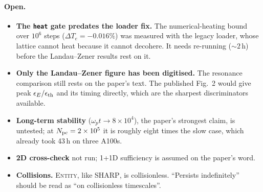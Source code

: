 \documentclass[11pt,a4paper]{article}
\newcommand{\code}[1]{\texttt{\small #1}}
\newcommand{\wpt}{\omega_p t}
\newcommand{\Npc}{N_{\rm pc}}
\begin{document}
\paragraph{Open.}
\begin{itemize}[nosep]
  \item \textbf{The \code{heat} gate predates the loader fix.} The numerical-heating
        bound over $10^6$ steps ($\Delta T_e = -0.016\%$) was measured with the legacy
        loader, whose lattice cannot heat because it cannot decohere. It needs
        re-running (${\sim}2$\,h) before the Landau--Zener results rest on it.
  \item \textbf{Only the Landau--Zener figure has been digitised.} The resonance
        comparison still rests on the paper's text. The published Fig.~2 would give
        peak $\epsilon_E/\epsilon_{\rm th}$ and its timing directly, which are the
        sharpest discriminators available.
  \item \textbf{Long-term stability} ($\wpt \to 8\times10^4$), the paper's strongest
        claim, is untested; at $\Npc = 2\times10^5$ it is roughly eight times the slow
        case, which already took 43\,h on three A100s.
  \item \textbf{2D cross-check} not run; 1+1D sufficiency is assumed on the paper's
        word.
  \item \textbf{Collisions.} \textsc{Entity}, like \textsc{SHARP}, is collisionless.
        ``Persists indefinitely'' should be read as ``on collisionless timescales''.
\end{itemize}
\end{document}
